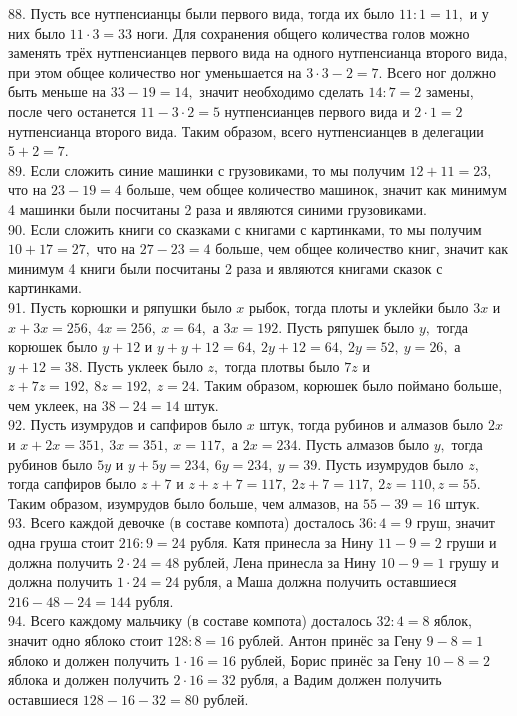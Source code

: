 \documentclass[12pt]{article}
\begin{document}
88. Пусть все нутпенсианцы были первого вида, тогда их было $11:1=11,$ и у них было $11\cdot3=33$ ноги. Для сохранения общего количества голов можно заменять трёх нутпенсианцев первого вида на одного нутпенсианца второго вида, при этом общее количество ног уменьшается на $3\cdot3-2=7.$ Всего ног должно быть меньше на  $33-19=14,$ значит необходимо сделать $14:7=2$ замены, после чего останется $11-3\cdot2=5$ нутпенсианцев первого вида и $2\cdot1=2$ нутпенсианца второго вида. Таким образом, всего нутпенсианцев в делегации $5+2=7.$\\
89. Если сложить синие машинки с грузовиками, то мы получим $12+11=23,$ что на $23-19=4$ больше, чем общее количество машинок, значит как минимум 4 машинки были посчитаны 2 раза и являются синими грузовиками.\\
90. Если сложить книги со сказками с книгами с картинками, то мы получим $10+17=27,$ что на $27-23=4$ больше, чем общее количество книг, значит как минимум 4 книги были посчитаны 2 раза и являются книгами сказок с картинками.\\
91. Пусть корюшки и ряпушки было $x$ рыбок, тогда плоты и уклейки было $3x$ и $x+3x=256,\ 4x=256,\ x=64,$ а $3x=192.$ Пусть ряпушек было $y,$ тогда корюшек было $y+12$ и $y+y+12=64,\ 2y+12=64,\ 2y=52,\ y=26,$ а $y+12=38.$ Пусть уклеек было $z,$ тогда плотвы было $7z$ и $z+7z=192,\ 8z=192,\ z=24.$ Таким образом, корюшек было поймано больше, чем уклеек, на $38-24=14$ штук.\\
92. Пусть изумрудов и сапфиров было $x$ штук, тогда рубинов и алмазов было $2x$ и $x+2x=351,\ 3x=351,\ x=117,$ а $2x=234.$ Пусть алмазов было $y,$ тогда рубинов было $5y$ и $y+5y=234,\ 6y=234,\ y=39.$ Пусть изумрудов было $z,$ тогда сапфиров было $z+7$ и $z+z+7=117,\ 2z+7=117,\ 2z=110, z=55.$ Таким образом, изумрудов было больше, чем алмазов, на $55-39=16$ штук.\\
93. Всего каждой девочке (в составе компота) досталось $36:4=9$ груш, значит одна груша стоит $216:9=24$ рубля. Катя принесла за Нину $11-9=2$ груши и должна получить $2\cdot24=48$ рублей, Лена принесла за Нину $10-9=1$ грушу и должна получить $1\cdot24=24$ рубля, а Маша должна получить оставшиеся $216-48-24=144$ рубля.\\
94. Всего каждому мальчику (в составе компота) досталось $32:4=8$ яблок, значит одно яблоко стоит $128:8=16$ рублей. Антон принёс за Гену $9-8=1$ яблоко и должен получить $1\cdot16=16$ рублей, Борис принёс за Гену $10-8=2$ яблока и должен получить $2\cdot16=32$ рубля, а Вадим должен получить оставшиеся $128-16-32=80$ рублей.\\
\end{document}
